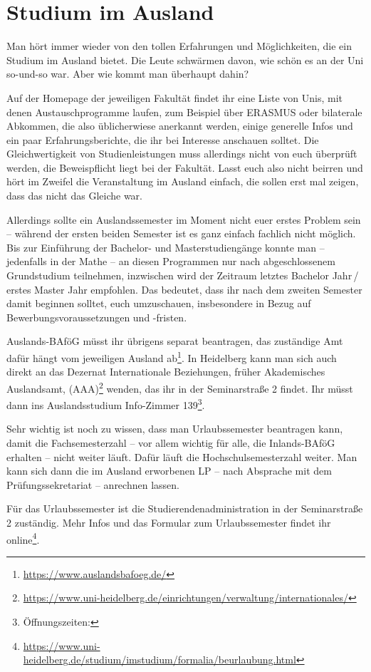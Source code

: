 \section{Studium im Ausland}
Man hört immer wieder von den tollen Erfahrungen und Möglichkeiten, die ein Studium im Ausland bietet. Die Leute schwärmen davon, wie schön es an der Uni so-und-so war. Aber wie kommt man überhaupt dahin?

Auf der Homepage der jeweiligen Fakultät findet ihr eine Liste von Unis, mit denen Austauschprogramme laufen, zum Beispiel über ERASMUS oder bilaterale Abkommen, die also üblicherwiese anerkannt werden, einige generelle Infos und ein paar Erfahrungsberichte, die ihr bei Interesse anschauen solltet. Die Gleichwertigkeit von Studienleistungen muss allerdings nicht von euch überprüft werden, die Beweispflicht liegt bei der Fakultät. Lasst euch also nicht beirren und hört im Zweifel die Veranstaltung im Ausland einfach, die sollen erst mal zeigen, dass das nicht das Gleiche war.

Allerdings sollte ein Auslandssemester im Moment nicht euer erstes Problem sein -- während der ersten beiden Semester ist es ganz einfach fachlich nicht möglich. Bis zur Einführung der Bachelor- und Masterstudiengänge konnte man -- jedenfalls in der Mathe -- an diesen Programmen nur nach abgeschlossenem Grundstudium teilnehmen, inzwischen wird der Zeitraum letztes Bachelor Jahr\,/\,erstes Master Jahr empfohlen. Das bedeutet, dass ihr nach dem zweiten Semester damit beginnen solltet, euch umzuschauen, insbesondere in Bezug auf Bewerbungsvoraussetzungen und -fristen.

Auslands-BAföG müsst ihr übrigens separat beantragen, das zu\-stän\-dige Amt dafür hängt vom jeweiligen Ausland ab\footnote{\url{https://www.auslandsbafoeg.de/}}. In Heidelberg kann man sich auch direkt an das Dezernat Internationale Beziehungen, früher Akademisches Auslandsamt, (AAA)\footnote{\url{https://www.uni-heidelberg.de/einrichtungen/verwaltung/internationales/}} wenden, das ihr in der Seminarstraße 2 findet. Ihr müsst dann ins Auslandsstudium Info-Zimmer 139\footnote{Öffnungszeiten: \auslandsinfooeff}.

Sehr wichtig ist noch zu wissen, dass man Urlaubssemester beantragen kann, damit die Fachsemesterzahl -- vor allem wichtig für alle, die Inlands-BAföG erhalten -- nicht weiter läuft. Dafür läuft die Hochschulsemesterzahl weiter. Man kann sich dann die im Ausland erworbenen \gls{LP} -- nach Absprache mit dem Prüfungssekretariat -- anrechnen lassen.

Für das Urlaubssemester ist die Studierendenadministration in der Seminarstraße 2 zuständig. Mehr Infos und das Formular zum Urlaubssemester findet ihr online\footnote{\url{https://www.uni-heidelberg.de/studium/imstudium/formalia/beurlaubung.html}}.

